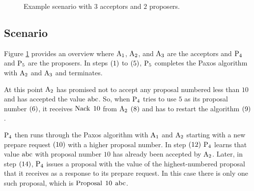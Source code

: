 \begin{figure}
\caption{Example scenario with $3$ acceptors and $2$ proposers.}
\label{fig:scenario}
\end{figure}

\subsection{Scenario}
Figure \ref{fig:scenario} provides an overview where $\operatorname{A_1}$, $\operatorname{A_2}$, and $\operatorname{A_3}$ are the acceptors and $\operatorname{P_4}$ and $\operatorname{P_5}$ are the proposers.
In steps $\left(1\right)$ to $\left(5\right)$, $\operatorname{P_5}$ completes the Paxos algorithm with $\operatorname{A_2}$ and $\operatorname{A_3}$ and terminates.

At this point $\operatorname{A_2}$ has promised not to accept any proposal numbered less than $10$ and has accepted the value $\operatorname{abc}$.
So, when $\operatorname{P_4}$ tries to use $5$ as its proposal number $\left(6\right)$, it receives $\operatorname{Nack}\; 10$ from $\operatorname{A_2}$ $\left(8\right)$ and has to restart the algorithm $\left(9\right)$.

$\operatorname{P_4}$ then runs through the Paxos algorithm with $\operatorname{A_1}$ and $\operatorname{A_2}$ starting with a new prepare request $\left(10\right)$ with a higher proposal number.
In step $\left(12\right)$ $\operatorname{P_4}$ learns that value $\operatorname{abc}$ with proposal number $10$ has already been accepted by $\operatorname{A_2}$.
Later, in step $\left(14\right)$, $\operatorname{P_4}$ issues a proposal with the value of the highest-numbered proposal that it receives as a response to its prepare request.
In this case there is only one such proposal, which is $\operatorname{Proposal}\; 10\; \operatorname{abc}$.

